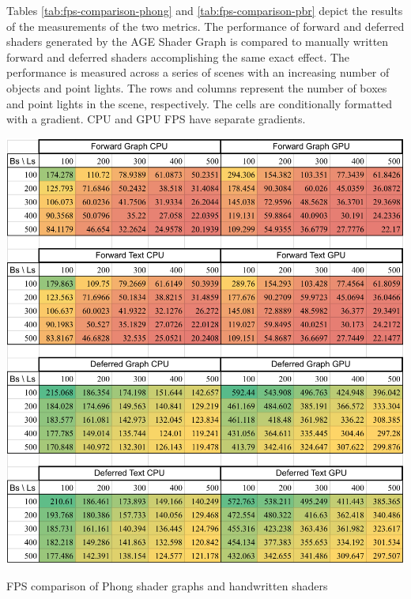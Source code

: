 \documentclass[
  digital,     %
  oneside,     %
  nosansbold,  %
  nocolorbold, %
  lof,         %
  lot,         %
]{fithesis4}
\begin{document}
Tables \ref{tab:fps-comparison-phong} and \ref{tab:fps-comparison-pbr} depict the results of the
measurements of the two metrics. The performance of forward and deferred shaders generated by the
AGE Shader Graph is compared to manually written forward and deferred shaders accomplishing the same exact effect.
The performance is measured across a series of scenes with an increasing number of objects
and point lights. The rows and columns represent the number of boxes and point lights in the scene, respectively.
The cells are conditionally formatted with a gradient. CPU and GPU FPS have separate gradients.
\begin{table}[H]
    \centering
    \includegraphics[width=\textwidth]{FPS/MeasureFPSReformat.png}
    \caption{FPS comparison of Phong shader graphs and handwritten shaders}
    \label{tab:fps-comparison-phong}
\end{table}
\end{document}
